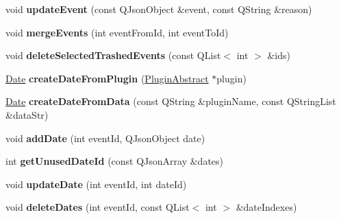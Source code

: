 \begin{DoxyCompactItemize}
\item 
\hypertarget{class_project_adb7b6a5a0b7604d8805d9dc0fa66c124}{void {\bfseries update\-Event} (const Q\-Json\-Object \&event, const Q\-String \&reason)}\label{class_project_adb7b6a5a0b7604d8805d9dc0fa66c124}

\item 
\hypertarget{class_project_aa5948e9cc588ec316cde551cf400b1ac}{void {\bfseries merge\-Events} (int event\-From\-Id, int event\-To\-Id)}\label{class_project_aa5948e9cc588ec316cde551cf400b1ac}

\item 
\hypertarget{class_project_a5ba24ea0fe94ce7b0b7aa9412a9d9ced}{void {\bfseries delete\-Selected\-Trashed\-Events} (const Q\-List$<$ int $>$ \&ids)}\label{class_project_a5ba24ea0fe94ce7b0b7aa9412a9d9ced}

\item 
\hypertarget{class_project_a60c79767da96fd3b8e40fdec2b3a7f48}{\hyperlink{class_date}{Date} {\bfseries create\-Date\-From\-Plugin} (\hyperlink{class_plugin_abstract}{Plugin\-Abstract} $\ast$plugin)}\label{class_project_a60c79767da96fd3b8e40fdec2b3a7f48}

\item 
\hypertarget{class_project_a7233f6c4ed42850cfabf97c02f79364f}{\hyperlink{class_date}{Date} {\bfseries create\-Date\-From\-Data} (const Q\-String \&plugin\-Name, const Q\-String\-List \&data\-Str)}\label{class_project_a7233f6c4ed42850cfabf97c02f79364f}

\item 
\hypertarget{class_project_a56abf8821194a30ac589684b34b1d72b}{void {\bfseries add\-Date} (int event\-Id, Q\-Json\-Object date)}\label{class_project_a56abf8821194a30ac589684b34b1d72b}

\item 
\hypertarget{class_project_ad5072b6f7ea8bc82fd76621a89791678}{int {\bfseries get\-Unused\-Date\-Id} (const Q\-Json\-Array \&dates)}\label{class_project_ad5072b6f7ea8bc82fd76621a89791678}

\item 
\hypertarget{class_project_a0c13681eda911017e430e07aff06d406}{void {\bfseries update\-Date} (int event\-Id, int date\-Id)}\label{class_project_a0c13681eda911017e430e07aff06d406}

\item 
\hypertarget{class_project_a19136f9b26885aa1c768a4cb548dd8b9}{void {\bfseries delete\-Dates} (int event\-Id, const Q\-List$<$ int $>$ \&date\-Indexes)}\label{class_project_a19136f9b26885aa1c768a4cb548dd8b9}


\end{DoxyCompactItemize}
